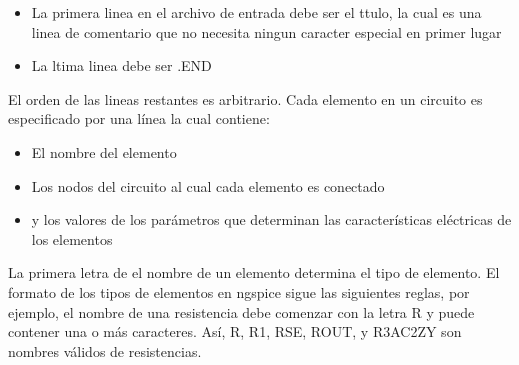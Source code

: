 \documentclass[12pt]{book}
\theoremstyle{definition}
\theoremstyle{remark}
\theoremstyle{plain}
\begin{document}
\begin{itemize}
\item La primera linea en el archivo de entrada debe ser el ttulo, la cual es una linea de comentario que no necesita ningun caracter especial en primer lugar
\item La ltima linea debe ser .END
\end{itemize}

El orden de las lineas restantes es arbitrario.
Cada elemento en un circuito es especificado por una línea la cual contiene:

\begin{itemize}
\item El nombre del elemento
\item Los nodos del circuito al cual cada elemento es conectado
\item y los valores de los parámetros que determinan las características eléctricas de los elementos
\end{itemize}

La primera letra de el nombre de un elemento determina el tipo de elemento. El formato de los tipos de elementos en ngspice sigue las siguientes reglas, por ejemplo, el nombre de una resistencia debe comenzar con la letra R y puede contener una o más caracteres. Así, R, R1, RSE, ROUT, y R3AC2ZY son nombres válidos de resistencias.

\backmatter
\end{document}
